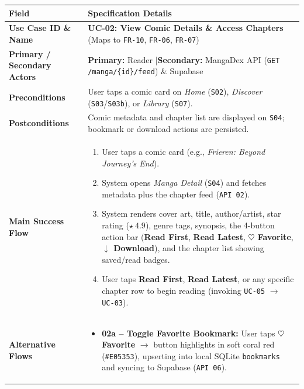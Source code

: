 \begin{table}[H]
\footnotesize
\renewcommand{\arraystretch}{1.22}
\begin{tabularx}{\textwidth}{L{3.2cm} Y}
\toprule
{}
\textbf{Field} & \textbf{Specification Details} \\
\midrule
\textbf{Use Case ID \& Name} & \textbf{UC-02: View Comic Details \& Access Chapters} (Maps to \texttt{FR-10}, \texttt{FR-06}, \texttt{FR-07}) \\
\textbf{Primary / Secondary Actors} & \textbf{Primary:} Reader \quad|\quad \textbf{Secondary:} MangaDex API (\texttt{GET /manga/\{id\}/feed}) \& Supabase \\
\textbf{Preconditions} & User taps a comic card on \textit{Home} (\texttt{S02}), \textit{Discover} (\texttt{S03}/\texttt{S03b}), or \textit{Library} (\texttt{S07}). \\
\textbf{Postconditions} & Comic metadata and chapter list are displayed on \texttt{S04}; bookmark or download actions are persisted. \\
\textbf{Main Success Flow} &
\begin{enumerate}[nosep,leftmargin=1.4em]
    \item User taps a comic card (e.g., \textit{Frieren: Beyond Journey's End}).
    \item System opens \textit{Manga Detail} (\texttt{S04}) and fetches metadata plus the chapter feed (\texttt{API 02}).
    \item System renders cover art, title, author/artist, star rating ($\star\ 4.9$), genre tags, synopsis, the 4-button action bar (\textbf{Read First}, \textbf{Read Latest}, \textbf{$\heartsuit$ Favorite}, \textbf{$\downarrow$ Download}), and the chapter list showing saved/read badges.
    \item User taps \textbf{Read First}, \textbf{Read Latest}, or any specific chapter row to begin reading (invoking \texttt{UC-05} $\to$ \texttt{UC-03}).
\end{enumerate} \\
\textbf{Alternative Flows} &
\begin{itemize}[nosep,leftmargin=1.4em]
    \item \textbf{02a -- Toggle Favorite Bookmark:} User taps \textbf{$\heartsuit$ Favorite} $\to$ button highlights in soft coral red (\texttt{\#E05353}), upserting into local SQLite \texttt{bookmarks} and syncing to Supabase (\texttt{API 06}).
\end{itemize} \\
\bottomrule
\end{tabularx}
\end{table}

